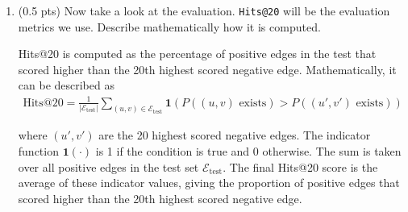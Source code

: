 \begin{enumerate}
\begin{enumerate}
        \item (0.5 pts) Now take a look at the evaluation. \texttt{Hits@20} will
        be the evaluation metrics we use. Describe mathematically how it is
        computed.

        Hits@20 is computed as the percentage of positive edges in the test that
        scored higher than the 20th highest scored negative edge. Mathematically, it can be described as
        \begin{align*}
            \text{Hits@20} = \frac{1}{|\mathcal{E}_{\text{test}}|} \sum_{(u, v) \in \mathcal{E}_{\text{test}}} \mathbf{1}\left(P((u, v) \text{~exists}) > P((u', v') \text{~exists})\right)
        \end{align*}

        where $(u', v')$ are the 20 highest scored negative edges. The indicator
        function $\mathbf{1}(\cdot)$ is 1 if the condition is true and 0
        otherwise. The sum is taken over all positive edges in the test set
        $\mathcal{E}_{\text{test}}$.  The final Hits@20 score is the average of
        these indicator values, giving the proportion of positive edges that
        scored higher than the 20th highest scored negative edge.

    \end{enumerate}


\end{enumerate}
